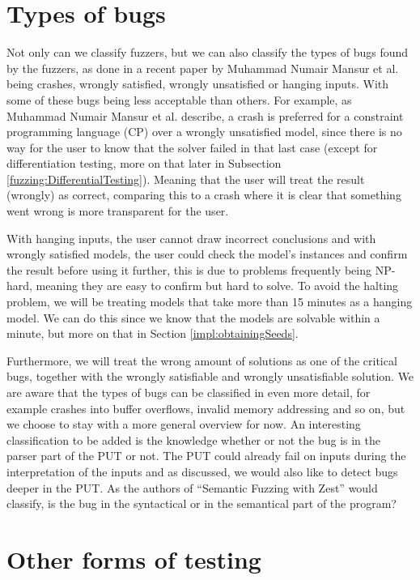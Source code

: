 \section{Types of bugs}
\label{fuzzing:TypesOfBugs}
Not only can we classify fuzzers, but we can also classify the types of bugs found by the fuzzers, as done in a recent paper \cite{1mansur2020detecting} by Muhammad Numair Mansur et al. being crashes, wrongly satisfied, wrongly unsatisfied or hanging inputs. With some of these bugs being less acceptable than others. For example, as Muhammad Numair Mansur et al. describe, a crash is preferred for a constraint programming language (CP) over a wrongly unsatisfied model, since there is no way for the user to know that the solver failed in that last case (except for differentiation testing, more on that later in Subsection \ref{fuzzing:DifferentialTesting}). Meaning that the user will treat the result (wrongly) as correct, comparing this to a crash where it is clear that something went wrong is more transparent for the user.

With hanging inputs, the user cannot draw incorrect conclusions and with wrongly satisfied models, the user could check the model’s instances and confirm the result before using it further, this is due to problems frequently being NP-hard, meaning they are easy to confirm but hard to solve. To avoid the halting problem, we will be treating models that take more than 15 minutes as a hanging model. We can do this since we know that the models are solvable within a minute, but more on that in Section \ref{impl:obtainingSeeds}. 

Furthermore, we will treat the wrong amount of solutions as one of the critical bugs, together with the wrongly satisfiable and wrongly unsatisfiable solution. We are aware that the types of bugs can be classified in even more detail, for example crashes into buffer overflows, invalid memory addressing and so on, but we choose to stay with a more general overview for now. An interesting classification to be added is the knowledge whether or not the bug is in the parser part of the PUT or not. The PUT could already fail on inputs during the interpretation of the inputs and as discussed, we would also like to detect bugs deeper in the PUT. As the authors of “Semantic Fuzzing with Zest” \cite{22SemanticFuzzing} would classify, is the bug in the syntactical or in the semantical part of the program?

\section{Other forms of testing}
